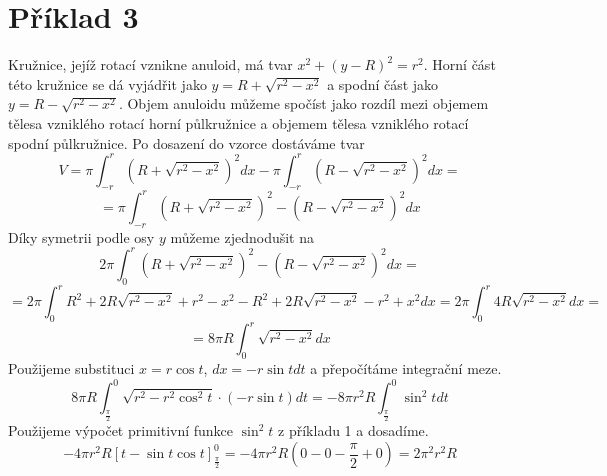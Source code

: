 \documentclass[11pt,a4paper]{article}
\begin{document}
\section*{Příklad 3}
Kružnice, jejíž rotací vznikne anuloid, má tvar $x^2 + (y-R)^2 = r^2$. Horní část této kružnice se dá vyjádřit jako $y = R + \sqrt{r^2-x^2}$ a spodní část jako
$y = R - \sqrt{r^2-x^2}$. Objem anuloidu můžeme spočíst jako rozdíl mezi objemem tělesa vzniklého rotací horní půlkružnice a objemem tělesa vzniklého rotací spodní půlkružnice. Po dosazení do vzorce dostáváme tvar
\begin{equation*}
V = \pi \int_{-r}^r \left( R+\sqrt{r^2-x^2} \right)^2 dx - \pi \int_{-r}^r \left( R - \sqrt{r^2-x^2} \right)^2 dx = 
\end{equation*}
\begin{equation*}
=
\pi \int_{-r}^r \left(R+\sqrt{r^2-x^2}\right)^2 - \left(R-\sqrt{r^2-x^2}\right)^2 dx 
\end{equation*}
Díky symetrii podle osy $y$ můžeme zjednodušit na
\begin{equation*}
2\pi \int_0^r \left(R+\sqrt{r^2-x^2}\right)^2 - \left(R-\sqrt{r^2-x^2}\right)^2 dx =
\end{equation*}
\begin{equation*}
=2\pi \int_0^r R^2 + 2R\sqrt{r^2-x^2} + r^2-x^2 - R^2 + 2R\sqrt{r^2-x^2} -r^2+x^2 dx = 
2\pi \int_0^r 4R\sqrt{r^2-x^2} dx =
\end{equation*} 
\begin{equation*}
= 8\pi R \int_0^r\sqrt{r^2-x^2} dx
\end{equation*}
Použijeme substituci $x = r\cos t$, $dx = -r\sin t dt$ a přepočítáme integrační meze.
\begin{equation*}
8\pi R \int_\frac{\pi}{2}^0 \sqrt{r^2-r^2\cos^2 t}\cdot (-r\sin t) dt =
-8\pi r^2R \int_\frac{\pi}{2}^0 \sin^2 t dt
\end{equation*}
Použijeme výpočet primitivní funkce $\sin^2 t$ z příkladu 1 a dosadíme.
\begin{equation*}
-4\pi r^2R [ t - \sin t \cos t ]_\frac{\pi}{2}^0 =
-4\pi r^2R (0-0-\frac{\pi}{2} + 0) = 2\pi^2r^2R
\end{equation*}
\end{document}
